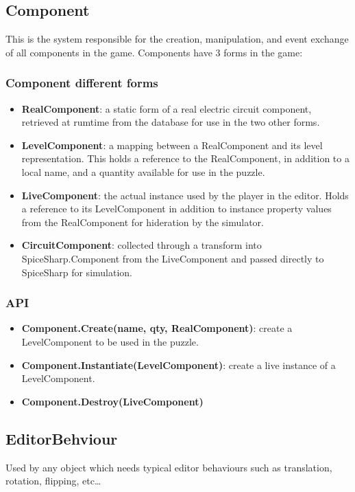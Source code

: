 \documentclass[../main.tex]{subfiles}
\begin{document}
\subsection{Component}
This is the system responsible for the creation, manipulation, and event exchange of all components in the game. Components have 3 forms in the game:

\subsubsection{Component different forms}
\begin{itemize}
    \item \textbf{RealComponent}: a static form of a real electric circuit component, retrieved at rumtime from the database for use in the two other forms.
    \item \textbf{LevelComponent}: a mapping between a RealComponent and its level representation. This holds a reference to the RealComponent, in addition to a local name, and a quantity available for use in the puzzle.
    \item \textbf{LiveComponent}: the actual instance used by the player in the editor. Holds a reference to its LevelComponent in addition to instance property values from the RealComponent for hideration by the simulator.
    \item \textbf{CircuitComponent}: collected through a transform into SpiceSharp.Component from the LiveComponent and passed directly to SpiceSharp for simulation. 
\end{itemize}

\subsubsection*{API}
\begin{itemize}
    \item \textbf{Component.Create(name, qty, RealComponent)}: create a LevelComponent to be used in the puzzle. 
    \item \textbf{Component.Instantiate(LevelComponent)}: create a live instance of a LevelComponent. 
    \item \textbf{Component.Destroy(LiveComponent)}
\end{itemize}

\subsection{EditorBehviour}
Used by any object which needs typical editor behaviours such as translation, rotation, flipping, etc\dots
\end{document}
